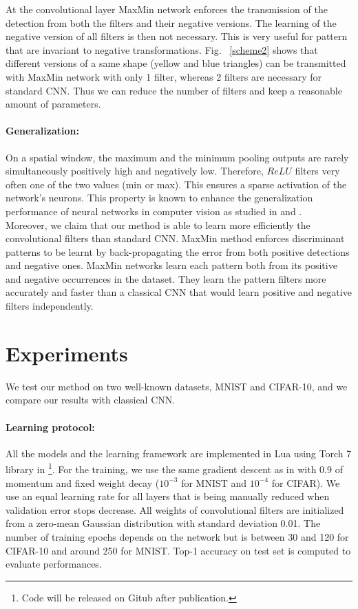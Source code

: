 \documentclass{article}
\begin{document}
At the convolutional layer MaxMin network enforces the transmission of the detection from both the filters and their negative versions. The learning of the negative version of all filters is then not necessary. This is very useful for pattern that are invariant to negative transformations. Fig.~ \ref{scheme2} shows that different versions of a same shape (yellow and blue triangles) can be transmitted with MaxMin network with only 1 filter, whereas 2 filters are necessary for standard CNN. Thus we can reduce the number of filters and keep a reasonable amount of parameters.
\vspace*{-0.6cm}\paragraph*{Generalization:}
On a spatial window, the maximum and the minimum pooling outputs are rarely simultaneously positively high and negatively low. Therefore, $ReLU$ filters very often one of the two values (min or max). This ensures a sparse activation of the network's neurons. This property is known to enhance the generalization performance of neural networks in computer vision as studied in \cite{sparse} and \cite{dropout}. \\
Moreover, we claim that our method is able to learn more efficiently the convolutional filters than standard CNN. MaxMin method enforces discriminant patterns to be learnt by back-propagating the error from both positive detections and negative ones. MaxMin networks learn each pattern both from its positive and negative occurrences in the dataset. They learn the pattern filters more accurately and faster than a classical CNN that would learn positive and negative filters independently. 

\section{Experiments}
\label{sec:typestyle}
We test our method on two well-known datasets, MNIST and CIFAR-10, and we compare our results with classical CNN. 

\paragraph*{Learning protocol:}
All the models and the learning framework are implemented in Lua using Torch 7 library in \cite{torch} \footnote{Code will be released on Gitub after publication.}. For the training, we use the same gradient descent as in \cite{alexnet} with 0.9 of momentum and fixed weight decay ($10^{-3}$ for MNIST and $10^{-4}$ for CIFAR). We use an equal learning rate for all layers that is being manually reduced when validation error stops decrease. All weights of convolutional filters are initialized from a zero-mean Gaussian distribution with standard deviation 0.01. The number of training epochs depends on the network but is between 30 and 120 for CIFAR-10 and around 250 for MNIST. Top-1 accuracy on test set is computed to evaluate performances.
\end{document}

